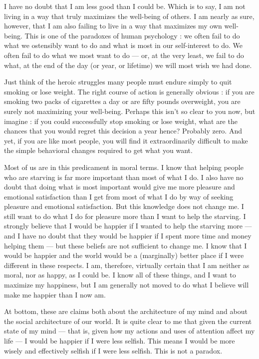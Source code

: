\documentclass[a4paper,14pt]{extbook}
\begin{document}
I have no doubt that I am less good than I could be.
Which is to say, I am not living in a way that truly maximizes the well-being of others.
I am nearly as sure, however, that I am also failing to live in a way that maximizes my own well-being.
This is one of the paradoxes of human psychology :
we often fail to do what we ostensibly want to do and what is most in our self-interest to do.
We often fail to do what we most want to do --- or, at the very least, we fail to do what, at the end of the day (or year, or lifetime) we will most wish we had done.

Just think of the heroic struggles many people must endure simply to quit smoking or lose weight.
The right course of action is generally obvious : if you are smoking two packs of cigarettes a day or are fifty pounds overweight, you are surely not maximizing your well-being.
Perhaps this isn't so clear to you now, but imagine : if you could successfully stop smoking or lose weight, what are the chances that you would regret this decision a year hence?
Probably zero.
And yet, if you are like most people, you will find it extraordinarily difficult to make the simple behavioral changes required to get what you want.

Most of us are in this predicament in moral terms.
I know that helping people who are starving is far more important than most of what I do.
I also have no doubt that doing what is most important would give me more pleasure and emotional satisfaction than I get from most of what I do by way of seeking pleasure and emotional satisfaction.
But this knowledge does not change me.
I still want to do what I do for pleasure more than I want to help the starving.
I strongly believe that I would be happier if I wanted to help the starving more --- and I have no doubt that they would be happier if I spent more time and money helping them --- but these beliefs are not sufficient to change me.
I know that I would be happier and the world would be a (marginally) better place if I were different in these respects.
I am, therefore, virtually certain that I am neither as moral, nor as happy, as I could be.
I know all of these things, and I want to maximize my happiness, but I am generally not moved to do what I believe will make me happier than I now am.

At bottom, these are claims both about the architecture of my mind and about the social architecture of our world.
It is quite clear to me that given the current state of my mind --- that is, given how my actions and uses of attention affect my life --- I would be happier if I were less selfish.
This means I would be more wisely and effectively selfish if I were less selfish.
This is not a paradox.
\end{document}
